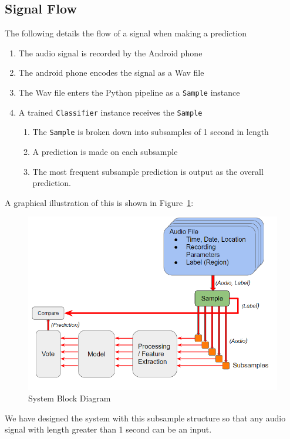 \documentclass[journal]{IEEEtran}
\begin{document}
\subsection{Signal Flow}\label{Signal Flow}
The following details the flow of a signal when making a prediction
\begin{enumerate}
\item The audio signal is recorded by the Android phone
\item The android phone encodes the signal as a Wav file
\item The Wav file enters the Python pipeline as a \texttt{Sample} instance
\item A trained \texttt{Classifier} instance receives the \texttt{Sample}
\begin{enumerate}
\item The \texttt{Sample} is broken down into subsamples of 1 second in length
\item A prediction is made on each subsample
\item The most frequent subsample prediction is output as the overall prediction.
\end{enumerate}
\end{enumerate}
A graphical illustration of this is shown in Figure~\ref{fig:bd}:\\
\begin{figure}[H]
\centering
\includegraphics[width=0.9\linewidth]{pred_flow}
\caption{System Block Diagram}
\label{fig:bd}
\end{figure}
We have designed the system with this subsample structure so that any audio signal with length greater than 1 second can be an input.
\end{document}
